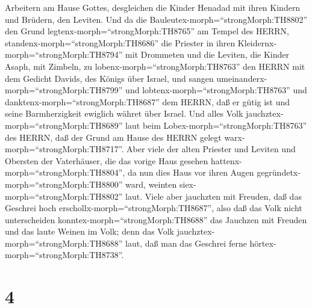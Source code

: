 Arbeitern am Hause Gottes, desgleichen die Kinder Henadad mit ihren
Kindern und Brüdern, den Leviten.  Und da die
Bauleutex-morph=``strongMorph:TH8802'' den Grund
legtenx-morph=``strongMorph:TH8765'' am Tempel des HERRN,
standenx-morph=``strongMorph:TH8686'' die Priester in ihren
Kleidernx-morph=``strongMorph:TH8794'' mit Drommeten und die Leviten,
die Kinder Asaph, mit Zimbeln, zu lobenx-morph=``strongMorph:TH8763''
den HERRN mit dem Gedicht Davids, des Königs über Israel, 
und sangen umeinanderx-morph=``strongMorph:TH8799'' und
lobtenx-morph=``strongMorph:TH8763'' und
danktenx-morph=``strongMorph:TH8687'' dem HERRN, daß er gütig ist und
seine Barmherzigkeit ewiglich währet über Israel. Und alles Volk
jauchztex-morph=``strongMorph:TH8689'' laut beim
Lobex-morph=``strongMorph:TH8763'' des HERRN, daß der Grund am Hause des
HERRN gelegt warx-morph=``strongMorph:TH8717''.  Aber viele
der alten Priester und Leviten und Obersten der Vaterhäuser, die das
vorige Haus gesehen hattenx-morph=``strongMorph:TH8804'', da nun dies
Haus vor ihren Augen gegründetx-morph=``strongMorph:TH8800'' ward,
weinten siex-morph=``strongMorph:TH8802'' laut. Viele aber jauchzten mit
Freuden, daß das Geschrei hoch erschollx-morph=``strongMorph:TH8687'',
 also daß das Volk nicht unterscheiden
konntex-morph=``strongMorph:TH8688'' das Jauchzen mit Freuden und das
laute Weinen im Volk; denn das Volk
jauchztex-morph=``strongMorph:TH8688'' laut, daß man das Geschrei ferne
hörtex-morph=``strongMorph:TH8738''.

\hypertarget{section-3}{%
\section{4}\label{section-3}}

